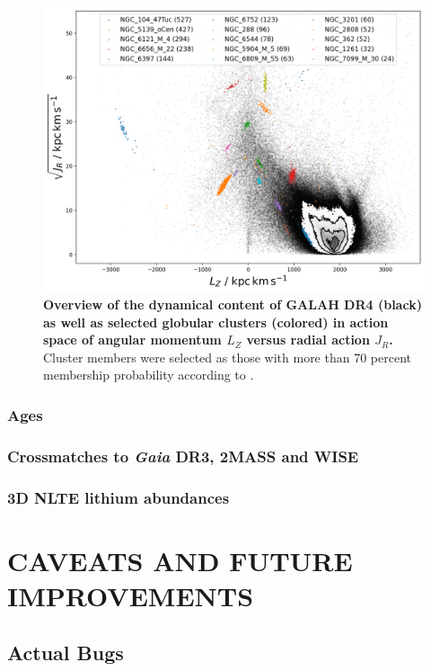 \documentclass[
  journal=pasa,
  manuscript=research-paper, %
  year=2023,
  volume=37
]{cup-journal}
\newcommand{\Gaia}{\textit{Gaia}\xspace}
\begin{document}
\begin{landscape}
\begin{figure}
\includegraphics[width=0.975\columnwidth]{figures/galah_dr4_lz_jr_with_gcs.png}
\caption{
\textbf{Overview of the dynamical content of GALAH DR4 (black) as well as selected globular clusters (colored) in action space of angular momentum $L_Z$ versus radial action $J_R$.} Cluster members were selected as those with more than 70 percent membership probability according to \citet{Vasiliev2021}.
}
\label{fig:galah_dr4_lz_jr_with_gcs}
\end{figure}
\end{landscape}

\subsubsection{Ages}

\subsubsection{Crossmatches to \Gaia DR3, 2MASS and WISE}

\subsubsection{3D NLTE lithium abundances}

\section{CAVEATS AND FUTURE IMPROVEMENTS} \label{sec:caveats}

\subsection{Actual Bugs}
\end{document}

